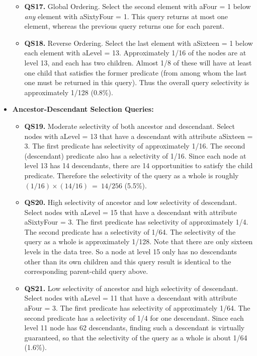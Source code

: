 \begin{itemize}
\begin{itemize}
\item {\bf QS17.} Global Ordering.  Select the second element with {\sf aFour = 1}
below
{\em any} element with {\sf aSixtyFour = 1}.  This query returns at most one
element, whereas the previous query returns one for each parent.

\item {\bf QS18.} Reverse Ordering.  Select the last element with {\sf aSixteen = 1} below
each element with {\sf aLevel = 13}.  Approximately 1/16 of the nodes are at
level 13, and each has two children.  Almost 1/8 of these will have at least
one child that satisfies the former predicate (from among whom the last one
must be returned in this query).  Thus the overall query selectivity is
approximately 1/128 (0.8\%).

\end{itemize}
\item
{\bf Ancestor-Descendant Selection Queries:}
\begin{itemize}
\item {\bf QS19.} Moderate selectivity of both ancestor and descendant.
Select nodes with {\sf aLevel = 13} that have a descendant with
attribute {\sf aSixteen = 3}.  The first predicate has selectivity
of approximately 1/16. The second (descendant) predicate also has
a selectivity of 1/16.  Since each node at level 13 has 14
descendants, there are 14 opportunities to satisfy the child
predicate. Therefore the selectivity of the query as a whole is
roughly $(1/16) \times (14/16)  ~=~ 14/256$ (5.5\%).

\item {\bf QS20.} High selectivity of ancestor and low selectivity of descendant.
Select nodes with {\sf aLevel = 15} that have a descendant with attribute {\sf
aSixtyFour = 3}.  The first predicate has selectivity of approximately 1/4.
The second predicate has a selectivity of 1/64.  The selectivity of the query
as a whole is approximately 1/128.  Note that there are only sixteen levels
in the data tree.  So a node at level 15 only has no descendants other than
its own children and this query result is identical to the corresponding
parent-child query above.

\item {\bf QS21.} Low selectivity of ancestor and high selectivity of descendant.
Select nodes with {\sf aLevel = 11} that have a descendant with attribute {\sf
aFour = 3}.  The first predicate has selectivity of approximately 1/64.
The second predicate has a selectivity of 1/4 for one descendant.  Since each
level 11 node has 62 descendants, finding such a descendant is virtually
guaranteed, so that the selectivity of the query as a whole is about 1/64 (1.6\%).
\end{itemize}


\end{itemize}
